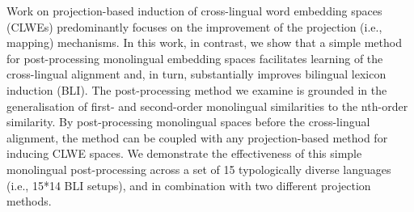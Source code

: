 Work on projection-based induction of cross-lingual word embedding spaces (CLWEs) predominantly focuses on the improvement of the projection (i.e., mapping) mechanisms. In this work, in contrast, we show that a simple method for post-processing monolingual embedding spaces  facilitates learning of the cross-lingual alignment and, in turn, substantially improves bilingual lexicon induction (BLI). The post-processing method we examine is grounded in the generalisation of first- and second-order monolingual similarities to the nth-order similarity. By post-processing monolingual spaces before the cross-lingual alignment, the method can be coupled with any projection-based method for inducing CLWE spaces. We demonstrate the effectiveness of this simple monolingual post-processing across a set of 15 typologically diverse languages (i.e., 15*14 BLI setups), and in combination with two different projection methods.
